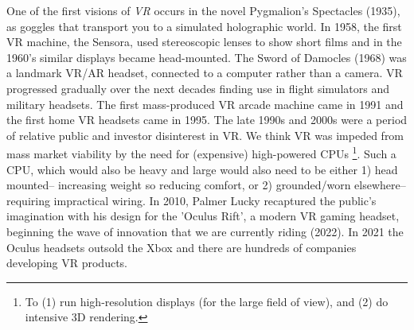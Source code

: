 \documentclass[logo,bsc,singlespacing,parskip]{infthesis}
\begin{document}
One of the first visions of \emph{VR} occurs in the novel Pygmalion's Spectacles (1935), as goggles that transport you to a simulated holographic world.
In 1958, the first VR machine, the Sensora, used stereoscopic lenses to show short films and in the 1960's similar displays became head-mounted.
The Sword of Damocles (1968) was a landmark VR/AR headset, connected to a computer rather than a camera.
VR progressed gradually over the next decades finding use in flight simulators and military headsets.
The first mass-produced VR arcade machine came in 1991 and the first home VR headsets came in 1995.
The late 1990s and 2000s were a period of relative public and investor disinterest in VR.
We think VR was impeded from mass market viability by the need for (expensive) high-powered CPUs \footnote{To (1) run high-resolution displays (for the large field of view), and (2) do intensive 3D rendering.}.
Such a CPU, which would also be heavy and large would also need to be either 1) head mounted-- increasing weight so reducing comfort, or 2) grounded/worn elsewhere-- requiring impractical wiring.
In 2010, Palmer Lucky recaptured the public's imagination with his design for the 'Oculus Rift', a modern VR gaming headset, beginning the wave of innovation that we are currently riding (2022).
In 2021 the Oculus headsets outsold the Xbox and there are hundreds of companies developing VR products.
\end{document}
